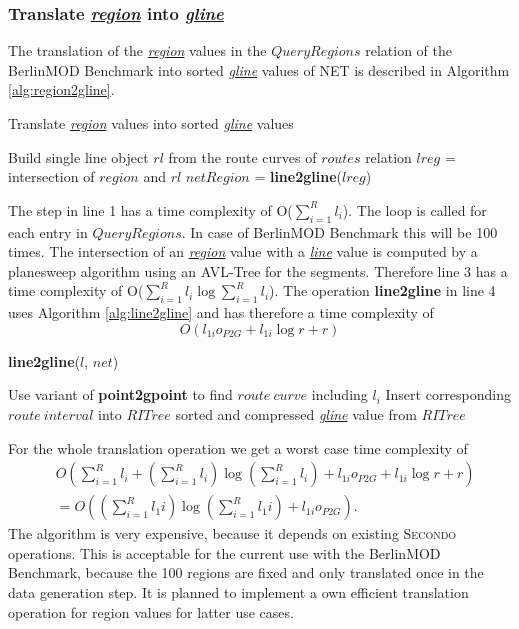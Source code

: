 \documentclass[a4paper]{article}
\newcommand{\secondo}{\textsc{Secondo}}
\newcommand{\bmodb} {BerlinMOD Benchmark}
\newcommand{\op}[1]{\textbf{#1}}
\newcommand{\dt}[1]{\textsl{\underline{#1}}}
\begin{document}
\subsubsection{Translate \dt{region} into \dt{gline}}
The translation of the \dt{region} values in the $QueryRegions$ relation of the
\bmodb{} into sorted \dt{gline} values of NET is described in Algorithm
\ref{alg:region2gline}.
\begin{algorithm}[H]
  \caption{Translate \dt{region} values into sorted \dt{gline} values}
  \label{alg:region2gline}
  \begin{algorithmic}[1]
     \STATE Build single line object $rl$ from the route curves of $routes$ relation
        \STATE $lreg$ = intersection of $region$ and $rl$
        \STATE $netRegion$ = \op{line2gline}($lreg$)
     \ENDFOR
  \end{algorithmic}
\end{algorithm}
The step in line 1 has a time complexity of O($\sum_{i=1}^{R}{l_i}$). The loop is
called for each entry in $QueryRegions$. In case of \bmodb{} this will be 100 times.
The intersection of an \dt{region} value with a \dt{line} value is computed by
a planesweep algorithm using an AVL-Tree for the segments. Therefore line 3 has a time
complexity of O($\sum_{i=1}^{R}{l_i} \log \sum_{i=1}^{R}{l_i}$). The operation
\op{line2gline} in line 4 uses Algorithm \ref{alg:line2gline} and has therefore
a time complexity of
\[O(l_{1i} o_{P2G} + l_{1i} \log r + r)\]
\begin{algorithm}
  \caption{\op{line2gline}($l$, $net$)}
  \label{alg:line2gline}
  \begin{algorithmic}[1]
      \STATE Use variant of \op{point2gpoint} to find $route\ curve$ including $l_i$
      \STATE Insert corresponding $route\ interval$ into $RITree$
    \ENDFOR
    \RETURN sorted and compressed \dt{gline} value from $RITree$
  \end{algorithmic}
\end{algorithm}
For the whole translation operation we get a worst case time complexity of
\begin{align*}
& O(\sum_{i=1}^{R}{l_i} + (\sum_{i=1}^{R}l_i) \log (\sum_{i=1}^{R}{l_i}) + l_{1i} o_{P2G}+ l_{1i} \log r + r)\\
& = O((\sum_{i=1}^{R}{l_1i}) \log (\sum_{i=1}^{R}{l_1i}) + l_{1i} o_{P2G}).
\end{align*}
The algorithm is very expensive, because it depends on existing \secondo{} operations.
This is acceptable for the current use with the \bmodb{},
because the 100 regions are fixed and only translated once in the data generation
step. It is planned to implement a own efficient translation operation for region
values for latter use cases.
\end{document}
